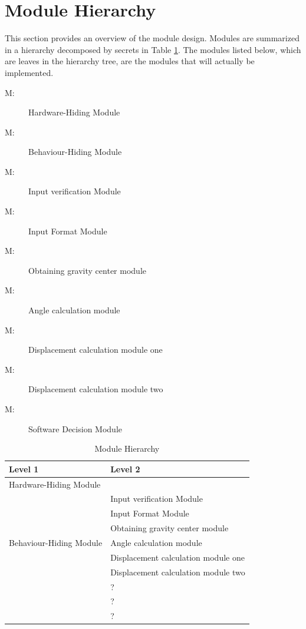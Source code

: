 \documentclass[12pt, titlepage]{article}
\newcounter{mnum}
\newcommand{\mthemnum}{M\themnum}
\begin{document}
	\section{Module Hierarchy} \label{SecMH}
	
	This section provides an overview of the module design. Modules are summarized
	in a hierarchy decomposed by secrets in Table \ref{TblMH}. The modules listed
	below, which are leaves in the hierarchy tree, are the modules that will
	actually be implemented.
	
	\begin{description}
		\item [ \mthemnum \label{mHH}:] Hardware-Hiding Module
		\item [ \mthemnum \label{mBH}:] Behaviour-Hiding Module
		\item [ \mthemnum \label{mIV}:] Input verification Module
		\item [ \mthemnum \label{mIF}:] Input Format Module
		\item [ \mthemnum \label{mOGC}:] Obtaining gravity center module
		\item [ \mthemnum \label{mAC}:] Angle calculation module
		\item [ \mthemnum \label{mDC1}:] Displacement calculation module one
		\item [ \mthemnum \label{mDC2}:] Displacement calculation module two
		\item [ \mthemnum \label{mSD}:] Software Decision Module
	\end{description}
	
	
	\begin{table}[h!]
		\centering
		\begin{tabular}{p{} p{}}
			\toprule
			\textbf{Level 1} & \textbf{Level 2}\\
			\midrule
			
			{Hardware-Hiding Module} & ~ \\
			\midrule
			
			\multirow{7}{0.3\textwidth}{Behaviour-Hiding Module} & Input verification Module\\
			& Input Format Module\\
			& Obtaining gravity center module\\
			& Angle calculation module\\
			& Displacement calculation module one\\
			& Displacement calculation module two\\
			\midrule
			
			\multirow{3}{0.3\textwidth}{Software Decision Module} & {?}\\
			& ?\\
			& ?\\
			\bottomrule
			
		\end{tabular}
		\caption{Module Hierarchy}
		\label{TblMH}
	\end{table}
	
\end{document}
